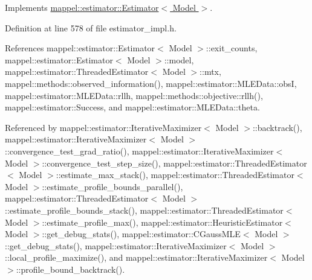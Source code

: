Implements \hyperlink{classmappel_1_1estimator_1_1Estimator_a2fefff348f9c25d7ae2cce9c12b7ec4e}{mappel\+::estimator\+::\+Estimator$<$ Model $>$}.



Definition at line 578 of file estimator\+\_\+impl.\+h.



References mappel\+::estimator\+::\+Estimator$<$ Model $>$\+::exit\+\_\+counts, mappel\+::estimator\+::\+Estimator$<$ Model $>$\+::model, mappel\+::estimator\+::\+Threaded\+Estimator$<$ Model $>$\+::mtx, mappel\+::methods\+::observed\+\_\+information(), mappel\+::estimator\+::\+M\+L\+E\+Data\+::obsI, mappel\+::estimator\+::\+M\+L\+E\+Data\+::rllh, mappel\+::methods\+::objective\+::rllh(), mappel\+::estimator\+::\+Success, and mappel\+::estimator\+::\+M\+L\+E\+Data\+::theta.



Referenced by mappel\+::estimator\+::\+Iterative\+Maximizer$<$ Model $>$\+::backtrack(), mappel\+::estimator\+::\+Iterative\+Maximizer$<$ Model $>$\+::convergence\+\_\+test\+\_\+grad\+\_\+ratio(), mappel\+::estimator\+::\+Iterative\+Maximizer$<$ Model $>$\+::convergence\+\_\+test\+\_\+step\+\_\+size(), mappel\+::estimator\+::\+Threaded\+Estimator$<$ Model $>$\+::estimate\+\_\+max\+\_\+stack(), mappel\+::estimator\+::\+Threaded\+Estimator$<$ Model $>$\+::estimate\+\_\+profile\+\_\+bounds\+\_\+parallel(), mappel\+::estimator\+::\+Threaded\+Estimator$<$ Model $>$\+::estimate\+\_\+profile\+\_\+bounds\+\_\+stack(), mappel\+::estimator\+::\+Threaded\+Estimator$<$ Model $>$\+::estimate\+\_\+profile\+\_\+max(), mappel\+::estimator\+::\+Heuristic\+Estimator$<$ Model $>$\+::get\+\_\+debug\+\_\+stats(), mappel\+::estimator\+::\+C\+Gauss\+M\+L\+E$<$ Model $>$\+::get\+\_\+debug\+\_\+stats(), mappel\+::estimator\+::\+Iterative\+Maximizer$<$ Model $>$\+::local\+\_\+profile\+\_\+maximize(), and mappel\+::estimator\+::\+Iterative\+Maximizer$<$ Model $>$\+::profile\+\_\+bound\+\_\+backtrack().

